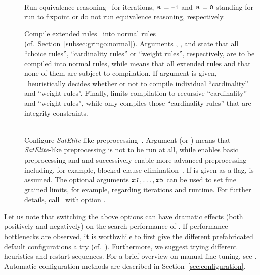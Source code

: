 \begin{description}
  \item[]~\\
    Run equivalence reasoning~\cite{gekanesc08a} for  iterations,
    $\texttt{\textit{n}}=\texttt{-1}$ and $\texttt{\textit{n}}=\texttt{0}$ standing for
    run to fixpoint or do not run equivalence reasoning, respectively.
  \item[]
    Compile extended rules~\cite{siniso02a} into normal rules (cf.~Section~\ref{subsec:gringo:normal}).
    Arguments ,  , and 
    state that all ``choice rules'', ``cardinality rules'' or ``weight rules'', respectively,
    are to be compiled into normal rules,
    while  means that all extended rules and  that none of them
    are subject to compilation. If argument  is given,
    \clasp\ heuristically decides whether or not to compile individual
    ``cardinality'' and ``weight rules''.
    Finally,  limits compilation to recursive ``cardinality'' and ``weight rules'',
    while  only compiles those ``cardinality rules'' that are integrity constraints.
  \item[]~\\
    Configure \emph{SatElite}-like preprocessing~\cite{eenbie05a}.
    Argument  (or ) means that \emph{SatElite}-like preprocessing is not to be run at all,
    while  enables basic preprocessing and  and  successively enable more
    advanced preprocessing including, for example, blocked clause elimination~\cite{jabihe10a}.
    If  is given as a flag,  is assumed.
    The optional arguments $\texttt{\textit{x1}},\ldots,\texttt{\textit{x5}}$ can be used
    to set fine grained limits, for example, regarding iterations and runtime.
    For further details, call \clasp\ with option .

\end{description}

Let us note that switching the above options can have dramatic effects
(both positively and negatively) on the search performance of \clasp.
If performance bottlenecks are observed, it is worthwhile to first
give the different prefabricated default configurations a try (cf.\ ).
Furthermore, we suggest trying different heuristics and restart sequences.
For a brief overview on manual fine-tuning, see \cite{gekasc09b}.
Automatic configuration methods are described in Section~\ref{sec:configuration}.


